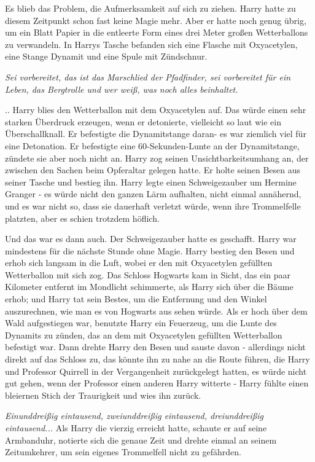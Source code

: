Es blieb das Problem, die Aufmerksamkeit auf sich zu ziehen. Harry hatte zu
diesem Zeitpunkt schon fast keine Magie mehr. Aber er hatte noch genug übrig, um
ein Blatt Papier in die entleerte Form eines drei Meter großen Wetterballons zu
verwandeln. In Harrys Tasche befanden sich eine Flasche mit Oxyacetylen, eine
Stange Dynamit und eine Spule mit Zündschnur.

\emph{Sei vorbereitet, das ist das Marschlied der Pfadfinder, sei vorbereitet für ein Leben, das Bergtrolle und wer weiß, was noch alles beinhaltet.}

.. Harry blies den Wetterballon mit dem Oxyacetylen auf. Das würde einen sehr
starken Überdruck erzeugen, wenn er detonierte, vielleicht so laut wie ein
Überschallknall. Er befestigte die Dynamitstange daran- es war ziemlich viel für
eine Detonation. Er befestigte eine 60-Sekunden-Lunte an der Dynamitstange,
zündete sie aber noch nicht an. Harry zog seinen Unsichtbarkeitsumhang an, der
zwischen den Sachen beim Opferaltar gelegen hatte. Er holte seinen Besen aus
seiner Tasche und bestieg ihn. Harry legte einen Schweigezauber um Hermine
Granger - es würde nicht den ganzen Lärm aufhalten, nicht einmal annähernd, und
es war nicht so, dass sie dauerhaft verletzt würde, wenn ihre Trommelfelle
platzten, aber es schien trotzdem höflich.

Und das war es dann auch. Der Schweigezauber hatte es geschafft. Harry war
mindestens für die nächste Stunde ohne Magie. Harry bestieg den Besen und erhob
sich langsam in die Luft, wobei er den mit Oxyacetylen gefüllten Wetterballon
mit sich zog. Das Schloss Hogwarts kam in Sicht, das ein paar Kilometer entfernt
im Mondlicht schimmerte, als Harry sich über die Bäume erhob; und Harry tat sein
Bestes, um die Entfernung und den Winkel auszurechnen, wie man es von Hogwarts
aus sehen würde. Als er hoch über dem Wald aufgestiegen war, benutzte Harry ein
Feuerzeug, um die Lunte des Dynamits zu zünden, das an dem mit Oxyacetylen
gefüllten Wetterballon befestigt war. Dann drehte Harry den Besen und sauste
davon - allerdings nicht direkt auf das Schloss zu, das könnte ihn zu nahe an
die Route führen, die Harry und Professor Quirrell in der Vergangenheit
zurückgelegt hatten, es würde nicht gut gehen, wenn der Professor einen anderen
Harry witterte - Harry fühlte einen bleiernen Stich der Traurigkeit und wies ihn
zurück.

\emph{Einunddreißig eintausend, zweiunddreißig eintausend, dreiunddreißig
eintausend...} Als Harry die vierzig erreicht hatte, schaute er auf seine
Armbanduhr, notierte sich die genaue Zeit und drehte einmal an seinem
Zeitumkehrer, um sein eigenes Trommelfell nicht zu gefährden.

